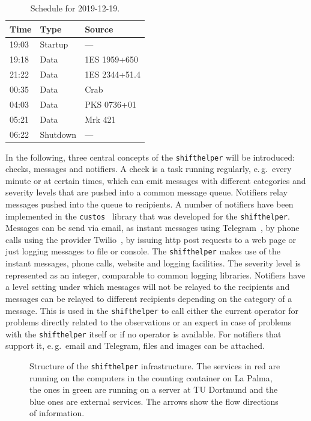 \begin{table}
  \caption{Schedule for 2019-12-19.}
  \label{tab:schedule}%
  \tablefont%
  \begin{tabular}{l l l}
    \toprule
    Time & Type & Source \\
    \midrule
    19:03 & Startup & — \\
    19:18 & Data & 1ES 1959+650 \\
    21:22 & Data & 1ES 2344+51.4 \\
    00:35 & Data & Crab \\
    04:03 & Data & PKS 0736+01 \\
    05:21 & Data & Mrk 421 \\
    06:22 & Shutdown & — \\
    \bottomrule
  \end{tabular}
\end{table}

In the following, three central concepts of the \texttt{shifthelper} will be introduced:
checks, messages and notifiers.
A check is a task running regularly, e.\,g.\ every minute or at certain
times, which can emit messages with different categories and severity levels that
are pushed into a common message queue.
Notifiers relay messages pushed into the queue to recipients.
A number of notifiers have been implemented in the \texttt{custos}~\cite{custos} library that
was developed for the \texttt{shifthelper}.
Messages can be send via email, as instant messages using Telegram~\cite{telegram},
by phone calls using the provider Twilio~\cite{twilio},
by issuing http post requests to a web page or just logging messages to file or console.
The \texttt{shifthelper} makes use of the instant messages, phone calls, website and logging facilities.
The severity level is represented as an integer, comparable to common logging libraries. 
Notifiers have a level setting under which messages will not be relayed to the
recipients and messages can be relayed to different recipients depending on the category of a message.
This is used in the \texttt{shifthelper} to call either the current operator for problems
directly related to the observations or an expert in case of 
problems with the \texttt{shifthelper} itself or if no operator is available.
For notifiers that support it, e.\,g.\ email and Telegram, files and images can be attached.

\begin{figure}
  \centering
  \begin{tikzpicture}
  
  \end{tikzpicture}
  \caption{%
    Structure of the \texttt{shifthelper} infrastructure.
    The services in red are running on the computers in the counting container on
    La Palma, the ones in green are running on a server at TU Dortmund and
    the blue ones are external services.
    The arrows show the flow directions of information.
  }\label{fig:shifthelper}
\end{figure}

